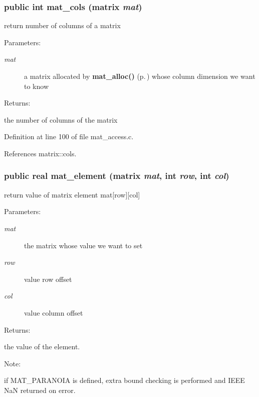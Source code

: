 \subsubsection{\setlength{\rightskip}{0pt plus 5cm}public int mat\_\-cols ({\bf matrix} {\em mat})}\label{group__matrix__access_a1}


return number of columns of a matrix

\begin{Desc}
\item[Parameters: ]\par
\begin{description}
\item[{\em 
mat}]a matrix allocated by {\bf mat\_\-alloc()} {\rm (p.\,\pageref{group__matrix__housekeeping_a0})} whose column dimension we want to know \end{description}
\end{Desc}
\begin{Desc}
\item[Returns: ]\par
the number of columns of the matrix \end{Desc}


Definition at line 100 of file mat\_\-access.c.

References matrix::cols.
\subsubsection{\setlength{\rightskip}{0pt plus 5cm}public {\bf real} mat\_\-element ({\bf matrix} {\em mat}, int {\em row}, int {\em col})}\label{group__matrix__access_a4}


return value of matrix element mat[row][col]

\begin{Desc}
\item[Parameters: ]\par
\begin{description}
\item[{\em 
mat}]the matrix whose value we want to set \item[{\em 
row}]value row offset \item[{\em 
col}]value column offset\end{description}
\end{Desc}
\begin{Desc}
\item[Returns: ]\par
the value of the element.\end{Desc}
\begin{Desc}
\item[Note: ]\par
if MAT\_\-PARANOIA is defined, extra bound checking is performed and IEEE Na\-N returned on error. \end{Desc}


